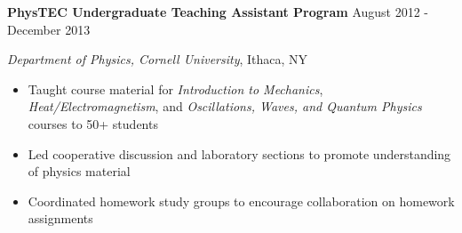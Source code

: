 
\vspace{7pt}

\textbf{PhysTEC Undergraduate Teaching Assistant Program} \hfill August 2012 - December 2013

\textit{Department of Physics, Cornell University}, Ithaca, NY

\begin{itemize}
    \item Taught course material for \textit{Introduction to Mechanics}, \textit{Heat/Electromagnetism}, and \textit{Oscillations, Waves, \newline and Quantum Physics} courses to 50+ students
    \item Led cooperative discussion and laboratory sections to promote understanding of physics material
    \item Coordinated homework study groups to encourage collaboration on homework assignments
\end{itemize}
